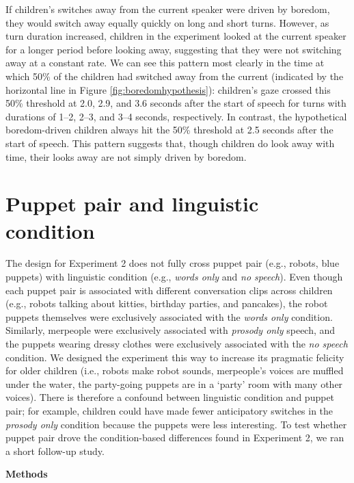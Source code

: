 \documentclass[authoryear, 12pt]{elsarticle}
\begin{document}
If children's switches away from the current speaker were driven by boredom, they would switch away equally quickly on long and short turns. However, as turn duration increased, children in the experiment looked at the current speaker for a longer period before looking away, suggesting that they were not switching away at a constant rate. We can see this pattern most clearly in the time at which 50\% of the children had switched away from the current (indicated by the horizontal line in Figure \ref{fig:boredomhypothesis}): children's gaze crossed this 50\% threshold at 2.0, 2.9, and 3.6 seconds after the start of speech for turns with durations of 1--2, 2--3, and 3--4 seconds, respectively. In contrast, the hypothetical boredom-driven children always hit the 50\% threshold at 2.5 seconds after the start of speech. This pattern suggests that, though children do look away with time, their looks away are not simply driven by boredom.

\clearpage

\section{Puppet pair and linguistic condition}
\label{sec:puppetconfound}
\setcounter{figure}{0}  
The design for Experiment 2 does not fully cross puppet pair (e.g., robots, blue puppets) with linguistic condition (e.g., \textit{words only} and \textit{no speech}). Even though each puppet pair is associated with different conversation clips across children (e.g., robots talking about kitties, birthday parties, and pancakes), the robot puppets themselves were exclusively associated with the \textit{words only} condition. Similarly, merpeople were exclusively associated with \textit{prosody only} speech, and the puppets wearing dressy clothes were exclusively associated with the \textit{no speech} condition. We designed the experiment this way to increase its pragmatic felicity for older children (i.e., robots make robot sounds, merpeople's voices are muffled under the water, the party-going puppets are in a `party' room with many other voices). There is therefore a confound between linguistic condition and puppet pair; for example, children could have made fewer anticipatory switches in the \textit{prosody only} condition because the puppets were less interesting. To test whether puppet pair drove the condition-based differences found in Experiment 2, we ran a short follow-up study.

\newpage
\noindent \textbf{Methods}
\medskip
\end{document}
